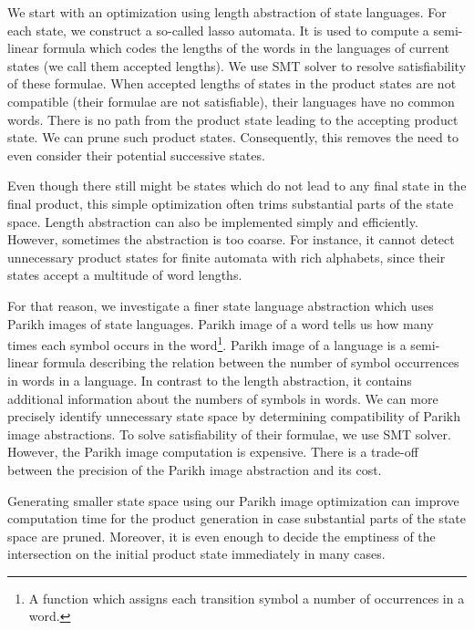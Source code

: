 
We start with an optimization using length abstraction of state languages. For each state, we construct a so-called lasso automata. It is used to compute a semi-linear formula which codes the lengths of the words in the languages of current states (we call them accepted lengths). We use SMT solver to resolve satisfiability of these formulae. When accepted lengths of states in the product states are not compatible (their formulae are not satisfiable), their languages have no common words. There is no path from the product state leading to the accepting product state. We can prune such product states. Consequently, this removes the need to even consider their potential successive states.

Even though there still might be states which do not lead to any final state in the final product, this simple optimization often trims substantial parts of the state space. Length abstraction can also be implemented simply and efficiently. However, sometimes the abstraction is too coarse. For instance, it cannot detect unnecessary product states for finite automata with rich alphabets, since their states accept a multitude of word lengths.


For that reason, we investigate a finer state language abstraction which uses Parikh images of state languages. Parikh image of a word tells us how many times each symbol occurs in the word\footnote{A function which assigns each transition symbol a number of occurrences in a word.}. Parikh image of a language is a semi-linear formula describing the relation between the number of symbol occurrences in words in a language. In contrast to the length abstraction, it contains additional information about the numbers of symbols in words. We can more precisely identify unnecessary state space by determining compatibility of Parikh image abstractions. To solve satisfiability of their formulae, we use SMT solver. However, the Parikh image computation is expensive. There is a trade-off between the precision of the Parikh image abstraction and its cost.

Generating smaller state space using our Parikh image optimization can improve computation time for the product generation in case substantial parts of the state space are pruned. Moreover, it is even enough to decide the emptiness of the intersection on the initial product state immediately in many cases.

